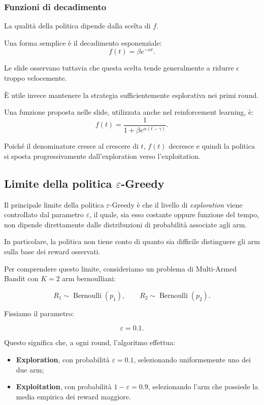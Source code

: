 \subsubsection{Funzioni di decadimento}

La qualità della politica dipende dalla scelta di $f$.

Una forma semplice è il decadimento esponenziale:
\[
f(t)=\beta e^{-\alpha t}.
\]

Le slide osservano tuttavia che questa scelta tende generalmente a ridurre $\epsilon$ troppo velocemente.

È utile invece mantenere la strategia sufficientemente esplorativa nei primi round.

Una funzione proposta nelle slide, utilizzata anche nel reinforcement learning, è:
\[
f(t)
=
\frac{1}
{1+\beta e^{\alpha(t-\gamma)}}.
\]

Poiché il denominatore cresce al crescere di $t$, $f(t)$ decresce e quindi la politica si sposta progressivamente dall'exploration verso l'exploitation.

\subsection{Limite della politica $\varepsilon$-Greedy}

Il principale limite della politica $\varepsilon$-Greedy è che il livello di
\textit{exploration} viene controllato dal parametro $\varepsilon$, il quale,
sia esso costante oppure funzione del tempo, non dipende direttamente dalle
distribuzioni di probabilità associate agli arm.

In particolare, la politica non tiene conto di quanto sia difficile distinguere
gli arm sulla base dei reward osservati.

Per comprendere questo limite, consideriamo un problema di Multi-Armed Bandit
con $K=2$ arm bernoulliani:

\[
R_{1}\sim\operatorname{Bernoulli}(p_1),
\qquad
R_{2}\sim\operatorname{Bernoulli}(p_2).
\]

Fissiamo il parametro:

\[
\varepsilon=0.1.
\]

Questo significa che, a ogni round, l'algoritmo effettua:
\begin{itemize}
    \item \textbf{Exploration}, con probabilità $\varepsilon=0.1$,
    selezionando uniformemente uno dei due arm;

    \item \textbf{Exploitation}, con probabilità $1-\varepsilon=0.9$,
    selezionando l'arm che possiede la media empirica dei reward maggiore.
\end{itemize}

